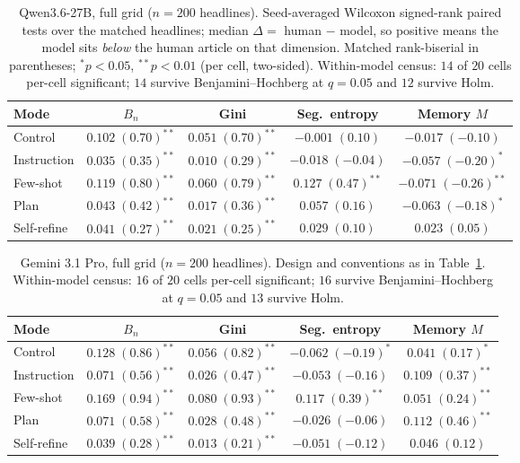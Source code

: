 \begin{table}[htbp]
\centering
\small
\caption{Qwen3.6-27B, full grid ($n=200$ headlines). Seed-averaged Wilcoxon signed-rank paired tests over the matched headlines; median $\Delta =$ human $-$ model, so positive means the model sits \emph{below} the human article on that dimension. Matched rank-biserial in parentheses; $^{*}p<0.05$, $^{**}p<0.01$ (per cell, two-sided). Within-model census: $14$ of $20$ cells per-cell significant; $14$ survive Benjamini--Hochberg at $q=0.05$ and $12$ survive Holm.}
\label{tab:promptceiling}
\begin{tabular}{lcccc}
\toprule
Mode & $B_n$ & Gini & Seg.\ entropy & Memory $M$ \\
\midrule
Control & $0.102\;(0.70)^{**}$ & $0.051\;(0.70)^{**}$ & $-0.001\;(0.10)$ & $-0.017\;(-0.10)$ \\
Instruction & $0.035\;(0.35)^{**}$ & $0.010\;(0.29)^{**}$ & $-0.018\;(-0.04)$ & $-0.057\;(-0.20)^{*}$ \\
Few-shot & $0.119\;(0.80)^{**}$ & $0.060\;(0.79)^{**}$ & $0.127\;(0.47)^{**}$ & $-0.071\;(-0.26)^{**}$ \\
Plan & $0.043\;(0.42)^{**}$ & $0.017\;(0.36)^{**}$ & $0.057\;(0.16)$ & $-0.063\;(-0.18)^{*}$ \\
Self-refine & $0.041\;(0.27)^{**}$ & $0.021\;(0.25)^{**}$ & $0.029\;(0.10)$ & $0.023\;(0.05)$ \\
\bottomrule
\end{tabular}
\end{table}

\begin{table}[htbp]
\centering
\small
\caption{Gemini 3.1 Pro, full grid ($n=200$ headlines). Design and conventions as in Table~\ref{tab:promptceiling}. Within-model census: $16$ of $20$ cells per-cell significant; $16$ survive Benjamini--Hochberg at $q=0.05$ and $13$ survive Holm.}
\label{tab:grid-gemini}
\begin{tabular}{lcccc}
\toprule
Mode & $B_n$ & Gini & Seg.\ entropy & Memory $M$ \\
\midrule
Control & $0.128\;(0.86)^{**}$ & $0.056\;(0.82)^{**}$ & $-0.062\;(-0.19)^{*}$ & $0.041\;(0.17)^{*}$ \\
Instruction & $0.071\;(0.56)^{**}$ & $0.026\;(0.47)^{**}$ & $-0.053\;(-0.16)$ & $0.109\;(0.37)^{**}$ \\
Few-shot & $0.169\;(0.94)^{**}$ & $0.080\;(0.93)^{**}$ & $0.117\;(0.39)^{**}$ & $0.051\;(0.24)^{**}$ \\
Plan & $0.071\;(0.58)^{**}$ & $0.028\;(0.48)^{**}$ & $-0.026\;(-0.06)$ & $0.112\;(0.46)^{**}$ \\
Self-refine & $0.039\;(0.28)^{**}$ & $0.013\;(0.21)^{**}$ & $-0.051\;(-0.12)$ & $0.046\;(0.12)$ \\
\bottomrule
\end{tabular}
\end{table}


